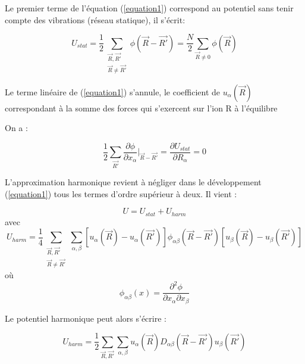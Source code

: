 \documentclass[12pt,a4paper]{book}
\begin{document}
Le premier terme de l'équation (\ref{equation1}) correspond au potentiel sans tenir compte des vibrations (réseau statique), il s'écrit:

\begin{equation}
U_{stat} = \frac{1}{2} \sum_{\substack{\overrightarrow{R},\overrightarrow{R'}\\ \overrightarrow{R}\neq \overrightarrow{R'}}} \phi(\overrightarrow{R}-\overrightarrow{R'}) = \frac{N}{2} \sum_{\overrightarrow{R}\neq0} \phi(\overrightarrow{R})
\end{equation}

Le terme linéaire de (\ref{equation1}) s'annule, le coefficient de $u_{\alpha}(\overrightarrow{R})$ correspondant à la somme des forces qui s'exercent sur l'ion R à l'équilibre

On a : 

\begin{equation}
\frac{1}{2} \sum_{\overrightarrow{R'}} \frac{\partial\phi}{\partial x_{\alpha}}\Big|_{\overrightarrow{R}-\overrightarrow{R'}} = \frac{\partial U_{stat}}{\partial R_{\alpha}} = 0
\end{equation}

L'approximation harmonique revient à négliger dans le développement (\ref{equation1}) tous les termes d'ordre supérieur à deux. Il vient :

\begin{equation}
U = U_{stat} + U_{harm}
\end{equation}
avec
\begin{equation}
U_{harm} = \frac{1}{4} \sum_{\substack{\overrightarrow{R},\overrightarrow{R'}\\ \overrightarrow{R}\neq \overrightarrow{R'}}} \sum_{\alpha,\beta}[u_{\alpha}(\overrightarrow{R})-u_{\alpha}(\overrightarrow{R'})] \phi_{\alpha\beta} (\overrightarrow{R}-\overrightarrow{R'})[u_{\beta}(\overrightarrow{R})-u_{\beta}(\overrightarrow{R'})] \label{equation2}
\end{equation}
où  \begin{equation}
\phi_{\alpha\beta}(x) = \frac{\partial^{2}\phi}{\partial x_{\alpha}\partial x_{\beta}}
\end{equation}

Le potentiel harmonique peut alors s'écrire :

\begin{equation}
U_{harm}= \frac{1}{2} \sum_{\overrightarrow{R},\overrightarrow{R'}} \sum_{\alpha,\beta} u_{\alpha} (\overrightarrow{R})D_{\alpha\beta}(\overrightarrow{R}-\overrightarrow{R'})u_{\beta}(\overrightarrow{R'}) \label{equation3}
\end{equation}
\end{document}
